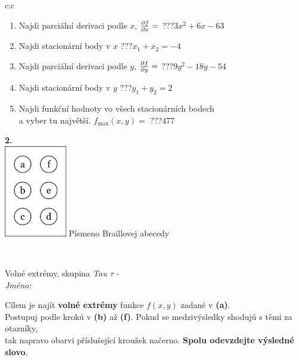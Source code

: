 \documentclass[10pt]{report}
\begin{document}
\begin{tabular}{c:c}
\begin{minipage}[c][104.5mm][t]{0.5\linewidth}
\begin{center}
\begin{minipage}{0.79\linewidth}
\begin{center}
\begin{varwidth}{\linewidth}
\begin{enumerate}
\item Najdi parciální derivaci podle $x$, $\pdv{f}{x}=$\quad \dotfill\; ???\;\dotfill \quad $3x^2+6x-63$
\item Najdi stacionární body v $x$\quad \dotfill\; ???\;\dotfill \quad $x_1+x_2=-4$
\item Najdi parciální derivaci podle $y$, $\pdv{f}{y}=$\quad \dotfill\; ???\;\dotfill \quad $9y^2-18y-54$
\item Najdi stacionární body v $y$\quad \dotfill\; ???\;\dotfill \quad $y_1+y_2=2$
\item Najdi funkční hodnoty vo všech stacionárních bodech \\ \phantom{xxxxxx} a vyber tu najvětší. $f_{\text{max}}(x,y)=$\quad \dotfill\; ???\;\dotfill \quad $477$
\end{enumerate}
\end{varwidth}
\end{center}
\end{minipage}
\begin{minipage}{0.20\linewidth}
\begin{center}
{\Huge\bfseries 2.} \\[2mm]
\includegraphics[height=40mm]{../images/braille.png}
{\small Písmeno Braillovej abecedy}
\end{center}
\end{minipage}
\end{center}
\end{minipage}
\\ \hdashline
\begin{minipage}[c][104.5mm][t]{0.5\linewidth}
\begin{center}
\vspace{7mm}
{\huge Volné extrémy, skupina \textit{Tau $\tau$} -}\\[5mm]
\textit{Jméno:}\phantom{xxxxxxxxxxxxxxxxxxxxxxxxxxxxxxxxxxxxxxxxxxxxxxxxxxxxxxxxxxxxxxxxx}\\[5mm]
\begin{minipage}{0.95\linewidth}
\begin{center}
Cílem je najít \textbf{volné extrémy} funkce $f(x,y)$ zadané v \textbf{(a)}.\\Postupuj podle krokú v \textbf{(b)} až \textbf{(f)}. Pokud se medzivýsledky shodujú s těmi za otazníky,\\tak napravo obarvi příslušející kroužek načerno. \textbf{Spolu odevzdejte výsledné slovo}.

\end{center}
\end{minipage}
\end{center}
\end{minipage}
\end{tabular}
\end{document}

